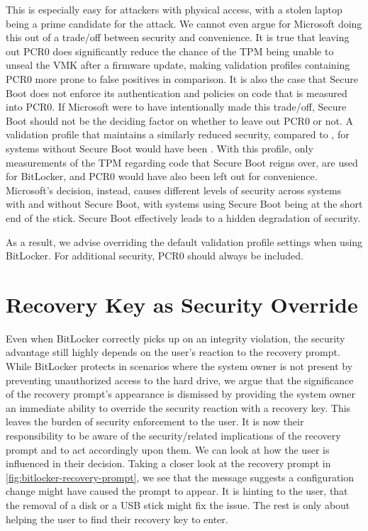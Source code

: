 This is especially easy for attackers with physical access, with a stolen laptop being a prime candidate for the attack.
We cannot even argue for Microsoft doing this out of a trade\-/off between security and convenience.
It is true that leaving out \ac{PCR}0 does significantly reduce the chance of the \ac{TPM} being unable to unseal the \ac{VMK} after a firmware update, making validation profiles containing \ac{PCR}0 more prone to false positives in comparison.
It is also the case that Secure Boot does not enforce its authentication and policies on code that is measured into \ac{PCR}0.
If Microsoft were to have intentionally made this trade\-/off, Secure Boot should not be the deciding factor on whether to leave out \ac{PCR}0 or not.
A validation profile that maintains a similarly reduced security, compared to \hyperref[tab:pcr-usage]{}, for systems without Secure Boot would have been \hyperref[tab:pcr-usage]{}.
With this profile, only measurements of the \ac{TPM} regarding code that Secure Boot reigns over, are used for BitLocker, and \ac{PCR}0 would have also been left out for convenience.
Microsoft's decision, instead, causes different levels of security across systems with and without Secure Boot, with systems using Secure Boot being at the short end of the stick.
Secure Boot effectively leads to a hidden degradation of security.

As a result, we advise overriding the default validation profile settings when using BitLocker.
For additional security, \ac{PCR}0 should always be included.

\section{Recovery Key as Security Override}

Even when BitLocker correctly picks up on an integrity violation, the security advantage still highly depends on the user's reaction to the recovery prompt.
While BitLocker protects in scenarios where the system owner is not present by preventing unauthorized access to the hard drive, we argue that the significance of the recovery prompt's appearance is dismissed by providing the system owner an immediate ability to override the security reaction with a recovery key.
This leaves the burden of security enforcement to the user.
It is now their responsibility to be aware of the security\-/related implications of the recovery prompt and to act accordingly upon them.
We can look at how the user is influenced in their decision.
Taking a closer look at the recovery prompt in \autoref{fig:bitlocker-recovery-prompt}, we see that the message suggests a configuration change might have caused the prompt to appear.
It is hinting to the user, that the removal of a disk or a \ac{USB} stick might fix the issue.
The rest is only about helping the user to find their recovery key to enter.

